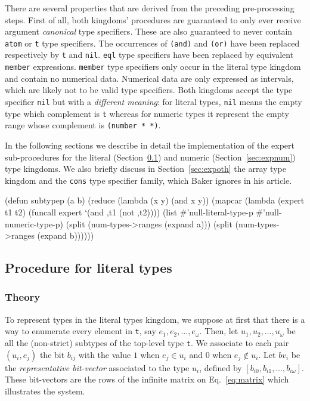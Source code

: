 \documentclass[format=sigconf]{acmart}
\newcommand\code[2][\small]{\sloppy\texttt{#1#2}}
\theoremstyle{definition}
\begin{document}
There are several properties that are derived from the preceding pre-processing
steps. First of all, both kingdoms' procedures are guaranteed to only ever
receive argument \emph{canonical} type specifiers. These are also guaranteed to never
contain \code{atom} or \code{t} type specifiers. The occurrences of \code{(and)}
and \code{(or)} have been replaced respectively by \code{t} and \code{nil}.
\code{eql} type specifiers have been replaced by equivalent \code{member} expressions.
\code{member} type specifiers only occur in the literal type kingdom and contain
no numerical data. Numerical data are only expressed as intervals, which are likely
not to be valid type specifiers. Both kingdoms accept the type specifier
\code{nil} but with a \emph{different meaning}: for literal types, \code{nil}
means the empty type which complement is \code{t} whereas for numeric types it
represent the empty range whose complement is \code{(number * *)}.

In the following sections we describe in detail the implementation of the expert
sub-procedures for the literal (Section~\ref{sec:explit}) and numeric
(Section~\ref{sec:expnum}) type kingdoms. We also briefly discuss in
Section~\ref{sec:expoth} the array type kingdom and the \code{cons} type
specifier family, which Baker ignores in his article.

\begin{listing}
\begin{clcode}
(defun subtypep (a b)
  (reduce (lambda (x y) (and x y))
          (mapcar (lambda (expert t1 t2)
                    (funcall expert `(and ,t1 (not ,t2))))
                  (list #'null-literal-type-p
                        #'null-numeric-type-p)
                  (split (num-types->ranges (expand a)))
                  (split (num-types->ranges (expand b))))))
\end{clcode}
\caption{A top-down approach of \code{subtypep}}
\label{lst:tdstp}
\end{listing}

\subsection{Procedure for literal types}
\label{sec:explit}
\subsubsection{Theory}
To represent types in the literal types kingdom, we suppose at first that there
is a way to enumerate every element in \code{t}, say $e_1, e_2, \dots, e_\omega$.
Then, let $u_1, u_2, \dots, u_\omega$ be all the (non-strict) subtypes of the
top-level type \code{t}. We associate to each pair $\left(u_i, e_j\right)$ the
bit $b_{ij}$ with the value $1$ when $e_j \in u_i$ and $0$ when $e_j \notin u_i$.
Let $bv_i$ be the \emph{representative bit-vector} associated to the type $u_i$,
defined by $\left[b_{i0}, b_{i1}, \dots, b_{i\omega}\right]$. These
bit-vectors are the rows of the infinite matrix on Eq.~\ref{eq:matrix} which
illustrates the system.
\end{document}
